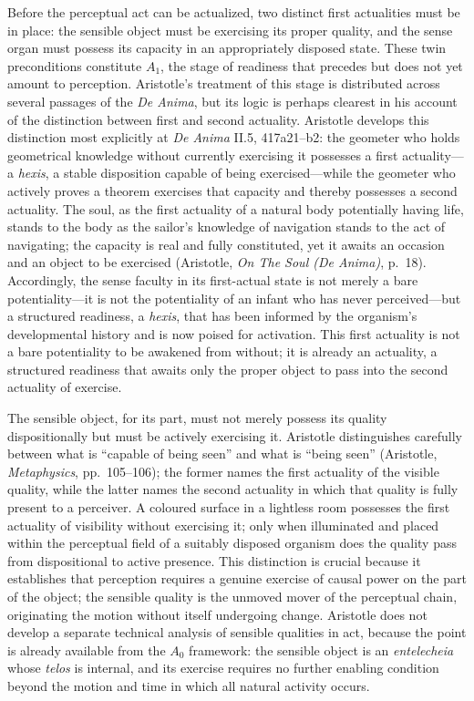 \documentclass[12pt]{article}
\begin{document}
Before the perceptual act can be actualized, two distinct first actualities must be in place: the sensible object must be exercising its proper quality, and the sense organ must possess its capacity in an appropriately disposed state. These twin preconditions constitute $A_1$, the stage of readiness that precedes but does not yet amount to perception. Aristotle's treatment of this stage is distributed across several passages of the \textit{De Anima}, but its logic is perhaps clearest in his account of the distinction between first and second actuality. Aristotle develops this distinction most explicitly at \textit{De Anima} II.5, 417a21--b2: the geometer who holds geometrical knowledge without currently exercising it possesses a first actuality---a \textit{hexis}, a stable disposition capable of being exercised---while the geometer who actively proves a theorem exercises that capacity and thereby possesses a second actuality. The soul, as the first actuality of a natural body potentially having life, stands to the body as the sailor's knowledge of navigation stands to the act of navigating; the capacity is real and fully constituted, yet it awaits an occasion and an object to be exercised (Aristotle, \textit{On The Soul (De Anima)}, p.~18). Accordingly, the sense faculty in its first-actual state is not merely a bare potentiality---it is not the potentiality of an infant who has never perceived---but a structured readiness, a \textit{hexis}, that has been informed by the organism's developmental history and is now poised for activation. This first actuality is not a bare potentiality to be awakened from without; it is already an actuality, a structured readiness that awaits only the proper object to pass into the second actuality of exercise.

The sensible object, for its part, must not merely possess its quality dispositionally but must be actively exercising it. Aristotle distinguishes carefully between what is ``capable of being seen'' and what is ``being seen'' (Aristotle, \textit{Metaphysics}, pp.~105--106); the former names the first actuality of the visible quality, while the latter names the second actuality in which that quality is fully present to a perceiver. A coloured surface in a lightless room possesses the first actuality of visibility without exercising it; only when illuminated and placed within the perceptual field of a suitably disposed organism does the quality pass from dispositional to active presence. This distinction is crucial because it establishes that perception requires a genuine exercise of causal power on the part of the object; the sensible quality is the unmoved mover of the perceptual chain, originating the motion without itself undergoing change. Aristotle does not develop a separate technical analysis of sensible qualities in act, because the point is already available from the $A_0$ framework: the sensible object is an \textit{entelecheia} whose \textit{telos} is internal, and its exercise requires no further enabling condition beyond the motion and time in which all natural activity occurs.
\end{document}
